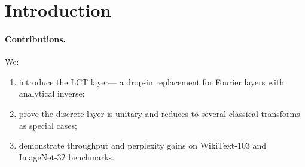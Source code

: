 \section{Introduction}

\paragraph{Contributions.}  We:
\begin{enumerate}
  \item introduce the \textsc{LCT} layer— a drop-in replacement for Fourier layers with analytical inverse;
  \item prove the discrete layer is unitary and reduces to several classical transforms as special cases;
  \item demonstrate throughput and perplexity gains on WikiText-103 and ImageNet-32 benchmarks.
\end{enumerate}